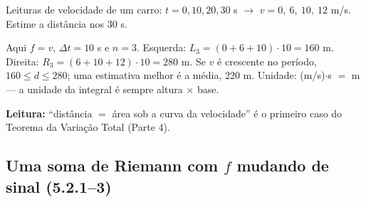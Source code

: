 \begin{exemplo}
Leituras de velocidade de um carro: $t=0,10,20,30$ s $\to$ $v=0,\ 6,\ 10,\ 12$ m/s. Estime a distância nos 30 s.

Aqui $f=v$, $\Delta t = 10$ s e $n=3$. Esquerda: $L_3=(0+6+10)\cdot 10=160$ m. Direita: $R_3=(6+10+12)\cdot 10=280$ m. Se $v$ é crescente no período, $160\le d\le 280$; uma estimativa melhor é a média, $220$ m. Unidade: (m/s)$\cdot$s $=$ m --- a unidade da integral é sempre altura $\times$ base.

\textbf{Leitura:} ``distância $=$ área sob a curva da velocidade'' é o primeiro caso do Teorema da Variação Total (Parte 4).
\end{exemplo}

\subsection{Uma soma de Riemann com $f$ mudando de sinal (5.2.1--3)}

